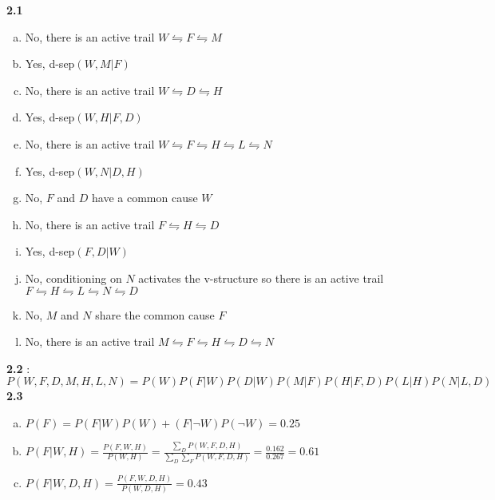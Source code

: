 \documentclass{article}
\begin{document}
\textbf{2.1} \begin{enumerate}[(a)]
    \item No, there is an active trail $W \leftrightharpoons F \leftrightharpoons M$
    \item Yes, d-sep$(W, M | F)$ 
    \item No, there is an active trail $W \leftrightharpoons D \leftrightharpoons H$
    \item Yes, d-sep$(W, H | F, D)$
    \item No, there is an active trail $W \leftrightharpoons F \leftrightharpoons H \leftrightharpoons L \leftrightharpoons N$
    \item Yes, d-sep$(W, N | D, H)$
    \item No, $F$ and $D$ have a common cause $W$
    \item No, there is an active trail $F \leftrightharpoons H \leftrightharpoons D$
    \item Yes, d-sep$(F, D | W)$
    \item No, conditioning on $N$ activates the v-structure so there is an active trail $F \leftrightharpoons H \leftrightharpoons L \leftrightharpoons N \leftrightharpoons D$
    \item No, $M$ and $N$ share the common cause $F$
    \item No, there is an active trail $M \leftrightharpoons F \leftrightharpoons H \leftrightharpoons D \leftrightharpoons N$
\end{enumerate}
\textbf{2.2} : $P(W, F, D, M, H, L, N) = P(W)P(F|W)P(D|W)P(M|F)P(H|F,D)P(L|H)P(N|L,D)$ \\[1.5ex]
\textbf{2.3} \begin{enumerate}[(a)]
    \item $P(F) = P(F|W)P(W) + (F|\neg W)P(\neg W) = 0.25$
    \item $P(F|W, H) = \frac{P(F, W, H)}{P(W, H)} = \frac{\sum_D P(W, F, D, H)}{\sum_D \sum_F P(W, F, D, H)} = \frac{0.162}{0.267} = 0.61$
    \item $P(F|W, D, H) = \frac{P(F, W, D, H)}{P(W, D, H)} = 0.43$
\end{enumerate}
\end{document}
